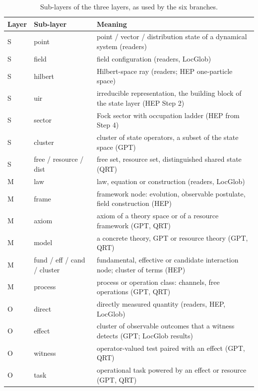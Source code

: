 \documentclass[11pt,a4paper,twoside,openany]{report}
\theoremstyle{plain}
\theoremstyle{definition}
\theoremstyle{remark}
\begin{document}
\begin{table}[htbp]\centering\small
\caption{Sub-layers of the three layers, as used by the six branches.}\label{tab:sublayers}
\begin{tabular}{@{}llp{9cm}@{}}\toprule
Layer & Sub-layer & Meaning \\\midrule
S & point & point / vector / distribution state of a dynamical system (readers) \\
S & field & field configuration (readers, LocGlob) \\
S & hilbert & Hilbert-space ray (readers; HEP one-particle space) \\
S & uir & irreducible representation, the building block of the state layer (HEP Step 2) \\
S & sector & Fock sector with occupation ladder (HEP from Step 4) \\
S & cluster & cluster of state operators, a subset of the state space (GPT) \\
S & free / resource / dist & free set, resource set, distinguished shared state (QRT) \\
M & law & law, equation or construction (readers, LocGlob) \\
M & frame & framework node: evolution, observable postulate, field construction (HEP) \\
M & axiom & axiom of a theory space or of a resource framework (GPT, QRT) \\
M & model & a concrete theory, GPT or resource theory (GPT, QRT) \\
M & fund / eff / cand / cluster & fundamental, effective or candidate interaction node; cluster of terms (HEP) \\
M & process & process or operation class: channels, free operations (GPT, QRT) \\
O & direct & directly measured quantity (readers, HEP, LocGlob) \\
O & effect & cluster of observable outcomes that a witness detects (GPT; LocGlob results) \\
O & witness & operator-valued test paired with an effect (GPT, QRT) \\
O & task & operational task powered by an effect or resource (GPT, QRT) \\\bottomrule
\end{tabular}
\end{table}
\end{document}

